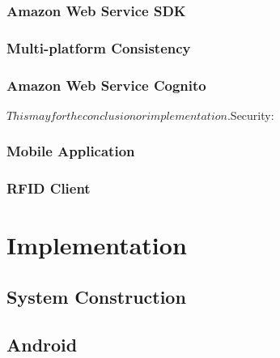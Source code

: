 \documentclass[a4paper, 11pt]{article}
\begin{document}
\subsubsection{Amazon Web Service SDK}
\subsubsection{Multi-platform Consistency}
\subsubsection{Amazon Web Service Cognito}




\(This may for the conclusion or implementation.\)Security:

\subsubsection{Mobile Application} 

\subsubsection{RFID Client} %

\section{Implementation}

\subsection{System Construction}
\subsection{Android} 
\end{document}
